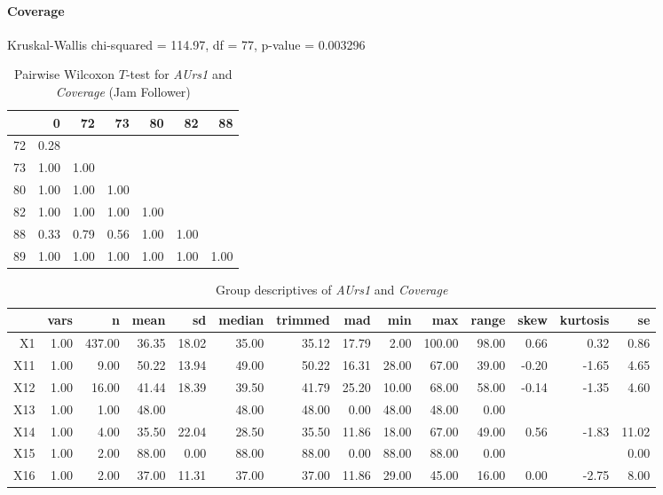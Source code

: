 \paragraph{Coverage}
Kruskal-Wallis chi-squared = 114.97, df = 77, p-value = 0.003296

\begin{table}[ht]
	\tiny
	\centering
	\begin{tabular}{rrrrrrr}
		\hline
		& 0 & 72 & 73 & 80 & 82 & 88 \\ 
		\hline
		72 & 0.28 &  &  &  &  &  \\ 
		73 & 1.00 & 1.00 &  &  &  &  \\ 
		80 & 1.00 & 1.00 & 1.00 &  &  &  \\ 
		82 & 1.00 & 1.00 & 1.00 & 1.00 &  &  \\ 
		88 & 0.33 & 0.79 & 0.56 & 1.00 & 1.00 &  \\ 
		89 & 1.00 & 1.00 & 1.00 & 1.00 & 1.00 & 1.00 \\ 
		\hline
	  \end{tabular}
    \caption{Pairwise Wilcoxon $T$-test for \textit{AUrs1} and \textit{Coverage} (Jam Follower)}
    \label{tbl:wilcoxon_baysis_follower_AUrs1_Cov}
\end{table}
\begin{table}[ht]
	\tiny
	\centering
	\begin{tabular}{rrrrrrrrrrrrrr}
		\hline
		& vars & n & mean & sd & median & trimmed & mad & min & max & range & skew & kurtosis & se \\ 
		\hline
		X1 & 1.00 & 437.00 & 36.35 & 18.02 & 35.00 & 35.12 & 17.79 & 2.00 & 100.00 & 98.00 & 0.66 & 0.32 & 0.86 \\ 
		X11 & 1.00 & 9.00 & 50.22 & 13.94 & 49.00 & 50.22 & 16.31 & 28.00 & 67.00 & 39.00 & -0.20 & -1.65 & 4.65 \\ 
		X12 & 1.00 & 16.00 & 41.44 & 18.39 & 39.50 & 41.79 & 25.20 & 10.00 & 68.00 & 58.00 & -0.14 & -1.35 & 4.60 \\ 
		X13 & 1.00 & 1.00 & 48.00 &  & 48.00 & 48.00 & 0.00 & 48.00 & 48.00 & 0.00 &  &  &  \\ 
		X14 & 1.00 & 4.00 & 35.50 & 22.04 & 28.50 & 35.50 & 11.86 & 18.00 & 67.00 & 49.00 & 0.56 & -1.83 & 11.02 \\ 
		X15 & 1.00 & 2.00 & 88.00 & 0.00 & 88.00 & 88.00 & 0.00 & 88.00 & 88.00 & 0.00 &  &  & 0.00 \\ 
		X16 & 1.00 & 2.00 & 37.00 & 11.31 & 37.00 & 37.00 & 11.86 & 29.00 & 45.00 & 16.00 & 0.00 & -2.75 & 8.00 \\ 
		\hline
	  \end{tabular}
    \caption{Group descriptives of \textit{AUrs1} and \textit{Coverage}}
    \label{tbl:descriptives_baysis_follower_AUrs1_Cov}
\end{table}

